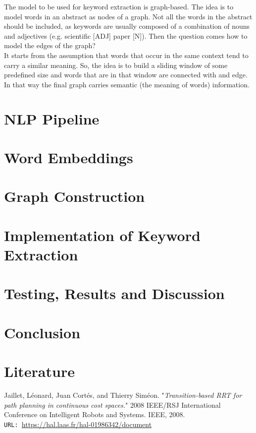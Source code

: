 \documentclass[12pt]{article}
\numberwithin{equation}{section}
\begin{document}
\begin{spacing}{1.5}
	The model to be used for keyword extraction is graph-based. The idea is to model words in an abstract as nodes of a graph. Not all the words in the abstract should be included, as keywords are usually composed of a combination of nouns and adjectives (e.g. scientific [ADJ] paper [N]). Then the question comes how to model the edges of the graph? \\
	It starts from the assumption that words that occur in the same context tend to carry a similar meaning. So, the idea is to build a sliding window of some predefined size and words that are in that window are connected with and edge. In that way the final graph carries semantic (the meaning of words) information.
	\section{NLP Pipeline}
	 
	\section{Word Embeddings}
	
	\section{Graph Construction}
	
	\section{Implementation of Keyword Extraction}
	
	\section{Testing, Results and Discussion}
	
	\section{Conclusion}
	
	\newpage
	\section{Literature}
	
	\begin{thebibliography}{8}
		Jaillet, Léonard, Juan Cortés, and Thierry Siméon. "\textit{Transition-based RRT for path planning in continuous cost spaces.}" 2008 IEEE/RSJ International Conference on Intelligent Robots and Systems. IEEE, 2008. \\
		\texttt{URL: }\url{https://hal.laas.fr/hal-01986342/document}
		

\end{thebibliography}
\end{spacing}
\end{document}

